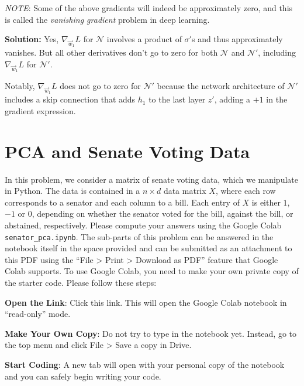 \documentclass[10pt]{article}
\theoremstyle{definition}
\theoremstyle{plain}
\begin{document}
\begin{enumerate}[label=(\alph*)]
\textit{NOTE}: Some of the above gradients will indeed be approximately zero, and this is called the \emph{vanishing gradient} problem in deep learning.

\textbf{Solution:} Yes, $\nabla_{\vec{w}_1} L$ for $\mathcal{N}$ involves a product of $\sigma'$s and thus approximately vanishes. But all other derivatives don't go to zero for both $\mathcal{N}$ and $\mathcal{N}'$, including $\nabla_{\vec{w}_1} L$ for $\mathcal{N}'$.

Notably, $\nabla_{\vec{w}_1} L$ does not go to zero for $\mathcal{N}'$ because the network architecture of $\mathcal{N}'$ includes a skip connection that adds $h_1$ to the last layer $z'$, adding a $+1$ in the gradient expression.
\end{enumerate}

\section{PCA and Senate Voting Data}

In this problem, we consider a matrix of senate voting data, which we manipulate in Python. The data is contained in a $n \times d$ data matrix $X$, where each row corresponds to a senator and each column to a bill. Each entry of $X$ is either $1$, $-1$ or $0$, depending on whether the senator voted for the bill, against the bill, or abstained, respectively. Please compute your answers using the Google Colab \texttt{senator\_pca.ipynb}. The sub-parts of this problem can be answered in the notebook itself in the space provided and can be submitted as an attachment to this PDF using the ``File > Print > Download as PDF'' feature that Google Colab supports. To use Google Colab, you need to make your own private copy of the starter code. Please follow these steps:

\textbf{Open the Link}: Click this link. This will open the Google Colab notebook in ``read-only'' mode.

\textbf{Make Your Own Copy}: Do not try to type in the notebook yet. Instead, go to the top menu and click File > Save a copy in Drive.

\textbf{Start Coding}: A new tab will open with your personal copy of the notebook and you can safely begin writing your code.
\end{document}
